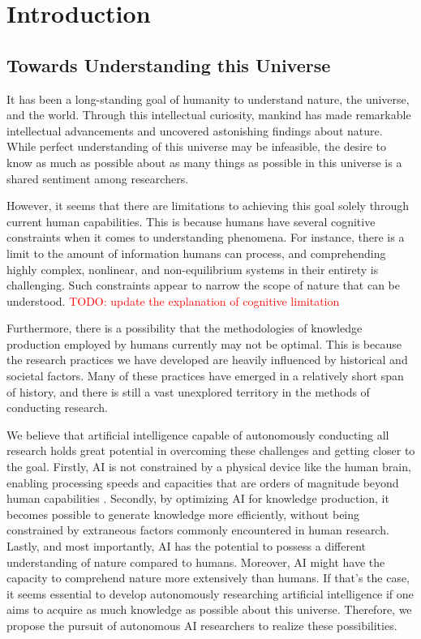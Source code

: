 \chapter{Introduction}

\section{Towards Understanding this Universe}
It has been a long-standing goal of humanity to understand nature, the universe, and the world. Through this intellectual curiosity, mankind has made remarkable intellectual advancements and uncovered astonishing findings about nature. While perfect understanding of this universe may be infeasible, the desire to know as much as possible about as many things as possible in this universe is a shared sentiment among researchers.

However, it seems that there are limitations to achieving this goal solely through current human capabilities. This is because humans have several cognitive constraints when it comes to understanding phenomena. For instance, there is a limit to the amount of information humans can process, and comprehending highly complex, nonlinear, and non-equilibrium systems in their entirety is challenging. Such constraints appear to narrow the scope of nature that can be understood. \textcolor{red}{TODO: update the explanation of cognitive limitation}

Furthermore, there is a possibility that the methodologies of knowledge production employed by humans currently may not be optimal. This is because the research practices we have developed are heavily influenced by historical and societal factors. Many of these practices have emerged in a relatively short span of history, and there is still a vast unexplored territory in the methods of conducting research.

We believe that artificial intelligence capable of autonomously conducting all research holds great potential in overcoming these challenges and getting closer to the goal. Firstly, AI is not constrained by a physical device like the human brain, enabling processing speeds and capacities that are orders of magnitude beyond human capabilities \cite{hope2022computational,kitano2021nobel}. Secondly, by optimizing AI for knowledge production, it becomes possible to generate knowledge more efficiently, without being constrained by extraneous factors commonly encountered in human research. Lastly, and most importantly, AI has the potential to possess a different understanding of nature compared to humans. Moreover, AI might have the capacity to comprehend nature more extensively than humans. If that's the case, it seems essential to develop autonomously researching artificial intelligence if one aims to acquire as much knowledge as possible about this universe. Therefore, we propose the pursuit of autonomous AI researchers to realize these possibilities.

